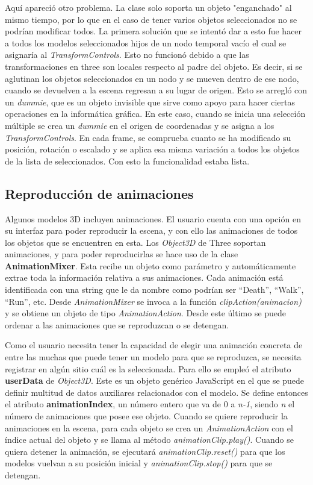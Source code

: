 Aquí apareció otro problema. La clase solo soporta un objeto "enganchado" al mismo tiempo, por lo que en el caso de tener varios objetos seleccionados no se podrían modificar todos. La primera solución que se intentó dar a esto fue hacer a todos los modelos seleccionados hijos de un nodo temporal vacío el cual se asignaría al \textit{TransformControls}. Esto no funcionó debido a que las transformaciones en three son locales respecto al padre del objeto. Es decir, si se aglutinan los objetos seleccionados en un nodo y se mueven dentro de ese nodo, cuando se devuelven a la escena regresan a su lugar de origen. Esto se arregló con un \textit{dummie}, que es un objeto invisible que sirve como apoyo para hacer ciertas operaciones en la informática gráfica. En este caso, cuando se inicia una selección múltiple se crea un \textit{dummie} en el origen de coordenadas y se asigna a los \textit{TransformControls}. En cada frame, se comprueba cuanto se ha modificado su posición, rotación o escalado y se aplica esa misma variación a todos los objetos de la lista de seleccionados. Con esto la funcionalidad estaba lista.

\subsection{Reproducción de animaciones}

Algunos modelos 3D incluyen animaciones. El usuario cuenta con una opción en su interfaz para poder reproducir la escena, y con ello las animaciones de todos los objetos que se encuentren en esta. Los \textit{Object3D} de Three soportan animaciones, y para poder reproducirlas se hace uso de la clase \textbf{AnimationMixer}. Esta recibe un objeto como parámetro y automáticamente extrae toda la información relativa a sus animaciones. Cada animación está identificada con una string que le da nombre como podrían ser ``Death'', ``Walk'', ``Run'', etc. Desde \textit{AnimationMixer} se invoca a la función \textit{clipAction(animacion)} y se obtiene un objeto de tipo \textit{AnimationAction}. Desde este último se puede ordenar a las animaciones que se reproduzcan o se detengan.

Como el usuario necesita tener la capacidad de elegir una animación concreta de entre las muchas que puede tener un modelo para que se reproduzca, se necesita registrar en algún sitio cuál es la seleccionada. Para ello se empleó el atributo \textbf{userData} de \textit{Object3D}. Este es un objeto genérico JavaScript en el que se puede definir multitud de datos auxiliares relacionados con el modelo. Se define entonces el atributo \textbf{animationIndex}, un número entero que va de 0 a \textit{n-1}, siendo \textit{n} el número de animaciones que posee ese objeto. Cuando se quiere reproducir la animaciones en la escena, para cada objeto se crea un \textit{AnimationAction} con el índice actual del objeto y se llama al método \textit{animationClip.play()}. Cuando se quiera detener la animación, se ejecutará \textit{animationClip.reset()} para que los modelos vuelvan a su posición inicial y \textit{animationClip.stop()} para que se detengan.

